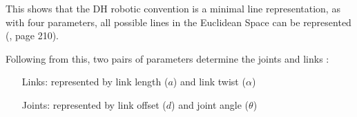 This shows that the \ac{DH} robotic convention is a minimal line representation, as with four parameters, all possible lines in the Euclidean Space can be represented (\cite{AutRobVeh}, page 210).

Following from this, two pairs of parameters determine the joints and links \cite{ConstantinForwardKA}:
\begin{itemize}[wide=\parindent] 
	\item[Links:] represented by link length ($a$) and link twist ($\alpha$)
	\item[Joints:] represented by link offset ($d$)
	and joint angle ($\theta$) 
\end{itemize}
\phantom{}\\
